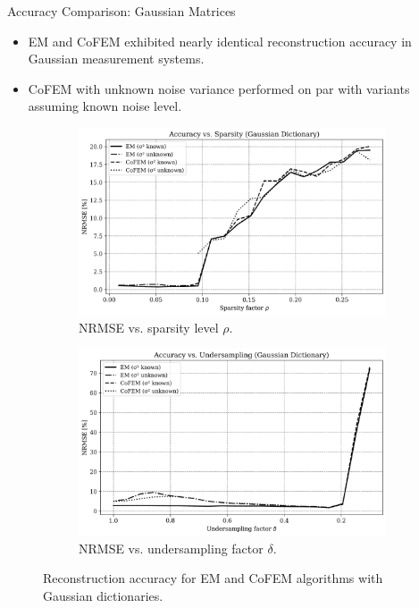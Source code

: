 \documentclass{beamer}
\begin{document}
\begin{frame}{Accuracy Comparison: Gaussian Matrices}
    \begin{itemize}
        \item EM and CoFEM exhibited nearly identical reconstruction accuracy in Gaussian measurement systems. 
        \item CoFEM with unknown noise variance performed on par with variants assuming known noise level. 
    \end{itemize}
    \begin{figure}[h!]
        \centering
        \begin{subfigure}[b]{0.48\textwidth}
            \includegraphics[width=\textwidth]{Figures/accuracy_vs_sparsity_EMCoFEM.png}
            \caption{NRMSE vs. sparsity level $\rho$. }
        \end{subfigure}
        \hfill
        \begin{subfigure}[b]{0.48\textwidth}
            \includegraphics[width=\textwidth]{Figures/accuracy_vs_undersampling_EMCoFEM.png}
            \caption{NRMSE vs. undersampling factor $\delta$. }
        \end{subfigure}
        \caption{Reconstruction accuracy for EM and CoFEM algorithms with Gaussian dictionaries.}
    \end{figure}
\end{frame}
\end{document}
